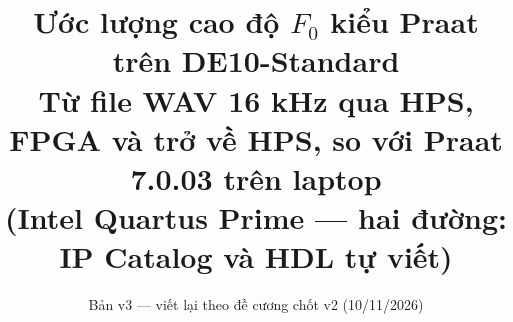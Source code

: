 \documentclass[11pt,a4paper]{article}
\begin{document}
\title{\textbf{Ước lượng cao độ $F_0$ kiểu Praat trên DE10-Standard}\\[0.35em]
\large Từ file WAV 16 kHz qua HPS, FPGA và trở về HPS, so với Praat 7.0.03 trên laptop\\[0.2em]
\large (Intel Quartus Prime --- hai đường: IP Catalog và HDL tự viết)}
\author{Bản v3 --- viết lại theo đề cương chốt v2 (10/11/2026)}
\date{}
\maketitle

\clearpage
{}
\renewcommand{\contentsname}{Mục lục}
\setcounter{tocdepth}{2}
\tableofcontents
\clearpage









\end{document}
